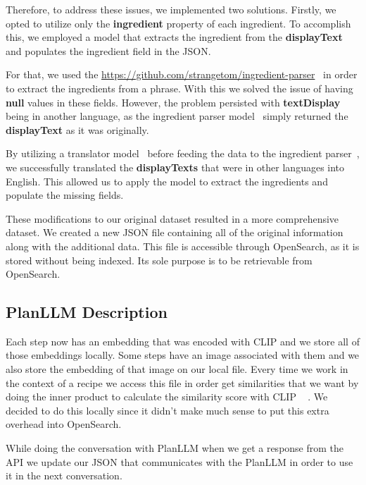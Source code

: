\documentclass[runningheads]{llncs}
\begin{document}
Therefore, to address these issues, we implemented two solutions. Firstly, we opted to utilize only the \textbf{ingredient} property of each ingredient. To accomplish this, we employed a model that extracts the ingredient from the \textbf{displayText} and populates the ingredient field in the JSON.

For that, we used the \url{https://github.com/strangetom/ingredient-parser}~\cite{ingredientParser} in order to extract the ingredients from a phrase. With this we solved the issue of having \textbf{null} values in these fields. However, the problem persisted with \textbf{textDisplay} being in another language, as the ingredient parser model~\cite{ingredientParser} simply returned the \textbf{displayText} as it was originally.

By utilizing a translator model~\cite{deeptranslate} before feeding the data to the ingredient parser~\cite{ingredientParser}, we successfully translated the \textbf{displayTexts} that were in other languages into English. This allowed us to apply the model to extract the ingredients and populate the missing fields.

These modifications to our original dataset resulted in a more comprehensive dataset. We created a new JSON file containing all of the original information along with the additional data. This file is accessible through OpenSearch, as it is stored without being indexed. Its sole purpose is to be retrievable from OpenSearch.

\subsection{PlanLLM Description}
Each step now has an embedding that was encoded with CLIP and we store all of those embeddings locally. Some steps have an image associated with them and we also store the embedding of that image on our local file. Every time we work in the context of a recipe we access this file in order get similarities that we want by doing the inner product to calculate the similarity score with CLIP ~\cite{clip} . We decided to do this locally since it didn't make much sense to put this extra overhead into OpenSearch.

While doing the conversation with PlanLLM when we get a response from the API we update our JSON that communicates with the PlanLLM in order to use it in the next conversation.


\end{document}
